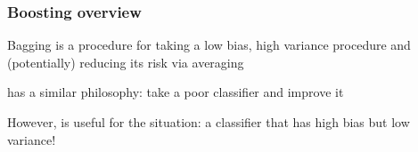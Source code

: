 \documentclass[12pt]{beamer}
\begin{document}
\title{}
\subtitle{\classTitle}
\date{}



\begin{frame}
\maketitle

\organization
%
\end{frame}


%
%
%
%
%
%


\begin{frame}[fragile]
\frametitle{Boosting overview}
 Bagging is a procedure for taking a low bias, high variance procedure
and (potentially) reducing its risk via averaging

\vsp
{} has a similar philosophy: take a poor classifier and improve it


\vsp
However,  is useful for the  situation: a classifier that has high bias but low variance!
\end{frame}
\end{document}
